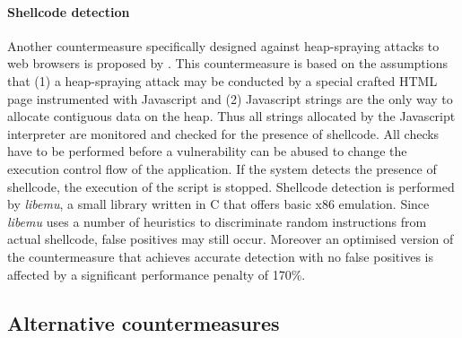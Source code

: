 \paragraph{Shellcode detection}
Another countermeasure specifically designed against heap-spraying attacks to web browsers is proposed by \cite{EURECOM}. This countermeasure is based on the assumptions that (1) a heap-spraying attack may be conducted by a special crafted HTML page instrumented with Javascript and (2) Javascript strings are the only way to allocate contiguous data on the heap. Thus all strings allocated by the Javascript interpreter are monitored and checked for the presence of shellcode. All checks have to be performed before a vulnerability can be abused to change the execution control flow of the application. If the system detects the presence of shellcode, the execution of the script is stopped. Shellcode detection is performed by \emph{libemu}, a small library written in C that offers basic x86 emulation. Since \emph{libemu} uses a number of heuristics to discriminate random instructions from actual shellcode, false positives may still occur. Moreover an optimised version of the countermeasure that achieves accurate detection with no false positives is affected by a significant performance penalty of 170\%.
 
\subsection{Alternative countermeasures} \label{sul}

